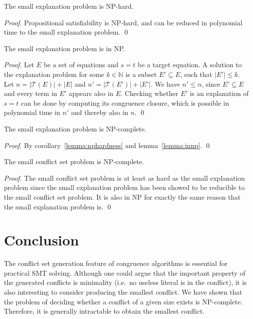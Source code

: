 \documentclass[smallextended]{svjour3}
\begin{document}
\begin{corollary}[NP-hardness]
\label{lemma:nphardness}
The small explanation problem is NP-hard.
\end{corollary}
\begin{proof}
Propositional satisfiability is NP-hard, and can be reduced in polynomial time to the small explanation problem.
\qed
\end{proof}

\begin{lemma}[NP]
\label{lemma:innp}
The small explanation problem is in NP.
\end{lemma}
\begin{proof}
Let $E$ be a set of equations and $s=t$ be a target equation.
A solution to the explanation problem for some $k \in \mathbb{N}$ is a subset $E' \subseteq E$, such that $|E'| \leq k$.
Let $n = |\mathcal{T}(E)| + |E|$ and $n' = |\mathcal{T}(E')| + |E'|$.
We have $n' \leq n$, since $E' \subseteq E$ and every term in $E'$ appears also in $E$.
Checking whether $E'$ is an explanation of $s=t$ can be done by computing its congruence closure, which is possible in polynomial time in $n'$ \cite{Nelson2} and thereby also in $n$.
\qed
\end{proof}


\begin{theorem}
The small explanation problem is NP-complete.
\end{theorem}
\begin{proof}
By corollary~\ref{lemma:nphardness} and lemma~\ref{lemma:innp}.
\qed
\end{proof}

\begin{theorem}
The small conflict set problem is NP-complete.
\end{theorem}
\begin{proof}
The small conflict set problem is at least as hard as the small explanation problem since the small explanation problem has been showed to be reducible to the small conflict set problem.  It is also in NP for exactly the same reason that the small explanation problem is.
\qed
\end{proof}


\section{Conclusion}

The conflict set generation feature of congruence algorithms is essential for
practical SMT solving.  Although one could argue that the important property of the generated conflicts is minimality (i.e.\ no useless literal is in the conflict), it is also interesting to consider producing the smallest conflict.  We have shown that the problem of deciding whether a conflict of a given size exists is NP-complete. Therefore, it is generally intractable to obtain the smallest conflict. 
\end{document}
